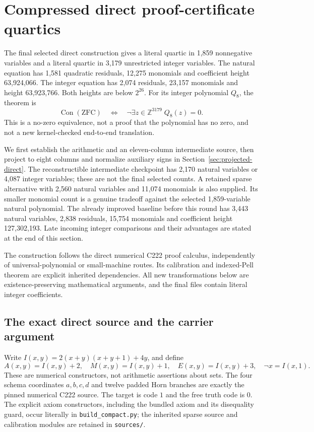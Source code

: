 \section{Compressed direct proof-certificate quartics}
\label{sec:round13-direct}

The final selected direct construction gives a literal quartic in 1,859
nonnegative variables and a literal quartic in 3,179 unrestricted integer
variables.  The natural equation has 1,581 quadratic residuals, 12,275
monomials and coefficient height 63,924,066.  The integer equation has
2,074 residuals, 23,157 monomials and height 63,923,766.  Both heights are
below $2^{26}$.  For its integer polynomial $Q_8$, the theorem is
\[
 \operatorname{Con}(\mathrm{ZFC})
 \quad\Longleftrightarrow\quad
 \neg\exists z\in\mathbb Z^{3179}\;Q_8(z)=0.
\]
This is a no-zero equivalence, not a proof that the polynomial has no zero,
and not a new kernel-checked end-to-end translation.

We first establish the arithmetic and an eleven-column intermediate
source, then project to eight columns and normalize auxiliary signs in
Section~\ref{sec:projected-direct}.  The reconstructible intermediate
checkpoint has 2,170 natural variables or 4,087 integer variables; these
are not the final selected counts.  A retained sparse alternative with
2,560 natural variables and 11,074 monomials is also supplied.  Its smaller
monomial count is a genuine tradeoff against the selected 1,859-variable
natural polynomial.  The already improved baseline before this round has
3,443 natural variables, 2,838 residuals, 15,754 monomials and coefficient
height 127,302,193.  Late incoming integer comparisons and their advantages
are stated at the end of this section.

The construction follows the direct numerical C222 proof calculus,
independently of universal-polynomial or small-machine routes.  Its
calibration and indexed-Pell theorem are explicit inherited dependencies.
All new transformations below are existence-preserving mathematical
arguments, and the final files contain literal integer coefficients.

\subsection{The exact direct source and the carrier argument}

Write $I(x,y)=2(x+y)(x+y+1)+4y$, and define
\[
 A(x,y)=I(x,y)+2,\quad M(x,y)=I(x,y)+1,\quad
 E(x,y)=I(x,y)+3,\quad \neg x=I(x,1).
\]
These are numerical constructors, not arithmetic assertions about sets.
The four schema coordinates $a,b,c,d$ and twelve padded Horn branches are
exactly the pinned numerical C222 source.  The target is code $1$ and the
free truth code is $0$.  The explicit axiom constructors, including the
bundled axiom and its disequality guard, occur literally in
\texttt{build\_compact.py}; the inherited sparse source and calibration
modules are retained in \texttt{sources/}.

